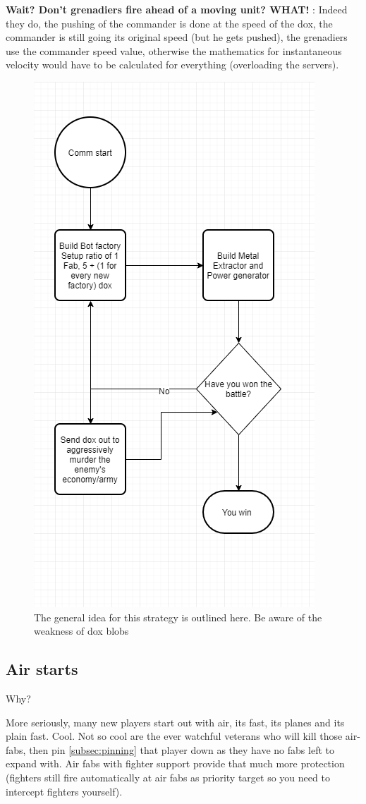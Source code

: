 \documentclass[]{article}
\begin{document}
\textbf{Wait? Don't grenadiers fire ahead of a moving unit? WHAT! }:  Indeed they do, the pushing of the commander is done at the speed of the dox, the commander is still going its original speed (but he gets pushed), the grenadiers use the commander speed value, otherwise the mathematics for instantaneous velocity would have to be calculated for everything (overloading the servers).


\begin{figure}[h]
	\centering
	\includegraphics[width=0.5\linewidth]{tZQ7AcE}
	\caption{The general idea for this strategy is outlined here. Be aware of the weakness of dox blobs}
	\label{fig:tzq7ace}
\end{figure}

\subsection{Air starts}


Why?  

More seriously, many new players start out with air, its fast, its planes and its plain fast.  Cool.  Not so cool are the ever watchful veterans who will kill those air-fabs, then pin \ref{subsec:pinning} that player down as they have no fabs left to expand with.  Air fabs with fighter support provide that much more protection (fighters still fire automatically at air fabs as priority target so you need to intercept fighters yourself).  
\end{document}
